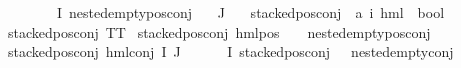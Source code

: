 \begin{isabellebody}
\ \ \ {\isacharparenleft}{\kern0pt}{\isasymforall}{\isasympsi}\ {\isasymin}\ {\isacharparenleft}{\kern0pt}{\isasymPhi}\ {\isacharbackquote}{\kern0pt}\ I{\isacharparenright}{\kern0pt}{\isachardot}{\kern0pt}\ nested{\isacharunderscore}{\kern0pt}empty{\isacharunderscore}{\kern0pt}pos{\isacharunderscore}{\kern0pt}conj\ {\isasympsi}{\isacharparenright}{\kern0pt}{\isacharparenright}{\kern0pt}{\isachardoublequoteclose}\isanewline
{\isachardoublequoteopen}{\isacharparenleft}{\kern0pt}{\isasymPhi}\ {\isacharbackquote}{\kern0pt}\ J{\isacharparenright}{\kern0pt}\ {\isacharequal}{\kern0pt}\ {\isacharbraceleft}{\kern0pt}{\isacharbraceright}{\kern0pt}{\isachardoublequoteclose}\isanewline
\isanewline
{}\isamarkupfalse%
\ stacked{\isacharunderscore}{\kern0pt}pos{\isacharunderscore}{\kern0pt}conj\ {\isacharcolon}{\kern0pt}{\isacharcolon}{\kern0pt}\ {\isachardoublequoteopen}{\isacharparenleft}{\kern0pt}{\isacharprime}{\kern0pt}a{\isacharcomma}{\kern0pt}\ {\isacharprime}{\kern0pt}i{\isacharparenright}{\kern0pt}\ hml\ {\isasymRightarrow}\ bool{\isachardoublequoteclose}\isanewline
\ \ \ \isanewline
{\isachardoublequoteopen}stacked{\isacharunderscore}{\kern0pt}pos{\isacharunderscore}{\kern0pt}conj\ TT{\isachardoublequoteclose}\ {\isacharbar}{\kern0pt}\isanewline
{\isachardoublequoteopen}stacked{\isacharunderscore}{\kern0pt}pos{\isacharunderscore}{\kern0pt}conj\ {\isacharparenleft}{\kern0pt}hml{\isacharunderscore}{\kern0pt}pos\ {\isacharunderscore}{\kern0pt}\ {\isasympsi}{\isacharparenright}{\kern0pt}{\isachardoublequoteclose}\ \ {\isachardoublequoteopen}nested{\isacharunderscore}{\kern0pt}empty{\isacharunderscore}{\kern0pt}pos{\isacharunderscore}{\kern0pt}conj\ {\isasympsi}{\isachardoublequoteclose}\ {\isacharbar}{\kern0pt}\isanewline
{\isachardoublequoteopen}stacked{\isacharunderscore}{\kern0pt}pos{\isacharunderscore}{\kern0pt}conj\ {\isacharparenleft}{\kern0pt}hml{\isacharunderscore}{\kern0pt}conj\ I\ J\ {\isasymPhi}{\isacharparenright}{\kern0pt}{\isachardoublequoteclose}\isanewline
{}\ {\isachardoublequoteopen}{\isasymforall}{\isasymphi}\ {\isasymin}\ {\isacharparenleft}{\kern0pt}{\isasymPhi}\ {\isacharbackquote}{\kern0pt}\ I{\isacharparenright}{\kern0pt}{\isachardot}{\kern0pt}\ {\isacharparenleft}{\kern0pt}{\isacharparenleft}{\kern0pt}stacked{\isacharunderscore}{\kern0pt}pos{\isacharunderscore}{\kern0pt}conj\ {\isasymphi}{\isacharparenright}{\kern0pt}\ {\isasymor}\ nested{\isacharunderscore}{\kern0pt}empty{\isacharunderscore}{\kern0pt}conj\ {\isasymphi}{\isacharparenright}{\kern0pt}{\isachardoublequoteclose}\isanewline

\end{isabellebody}
